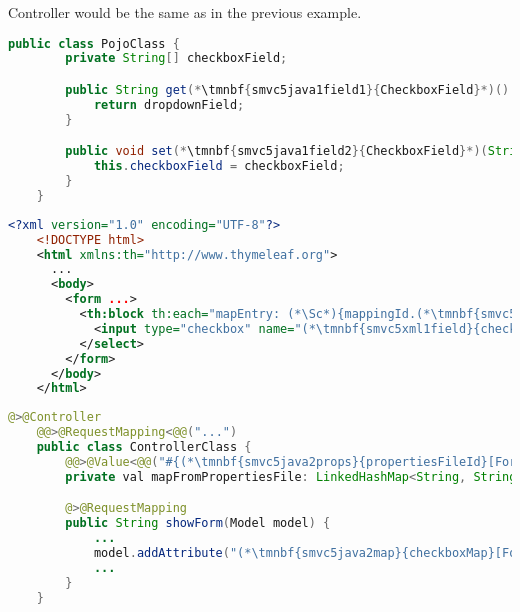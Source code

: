 \notenonl Controller would be the same as in the previous example.
\newpage

\enlargethispage{10mm}
\begin{lstlisting}[language=Java, title={POJO class with one array field}]
    public class PojoClass {
        private String[] checkboxField;

        public String get(*\tmnbf{smvc5java1field1}{CheckboxField}*)() {
            return dropdownField;
        }

        public void set(*\tmnbf{smvc5java1field2}{CheckboxField}*)(String[] checkboxField) {
            this.checkboxField = checkboxField;
        }
    }
\end{lstlisting}
\begin{lstlisting}[language=XML, title={HTML form setting the field}]
    <?xml version="1.0" encoding="UTF-8"?>
    <!DOCTYPE html>
    <html xmlns:th="http://www.thymeleaf.org">
      ...
      <body>
        <form ...>
          <th:block th:each="mapEntry: (*\Sc*){mappingId.(*\tmnbf{smvc5xml1map}{checkboxMap}[ForestGreen]*).entrySet()}">
            <input type="checkbox" name="(*\tmnbf{smvc5xml1field}{checkboxField}[ForestGreen]*)" th:value="(*\Sc*){mapEntry.key}"><span th:text="(*\Sc*){mapEntry.value}"/><br/>
          </select>
        </form>
      </body>
    </html>
\end{lstlisting}
\begin{lstlisting}[language=Java, title={Controller converting \textit{properties} file to a map}]
    @>@Controller
    @@>@RequestMapping<@@("...")
    public class ControllerClass {
        @@>@Value<@@("#{(*\tmnbf{smvc5java2props}{propertiesFileId}[ForestGreen]*)}") // Parsing the properties file
        private val mapFromPropertiesFile: LinkedHashMap<String, String>;

        @>@RequestMapping
        public String showForm(Model model) {
            ...
            model.addAttribute("(*\tmnbf{smvc5java2map}{checkboxMap}[ForestGreen]*)", mapFromPropertiesFile)
            ...
        }
    }
\end{lstlisting}
\newpage

